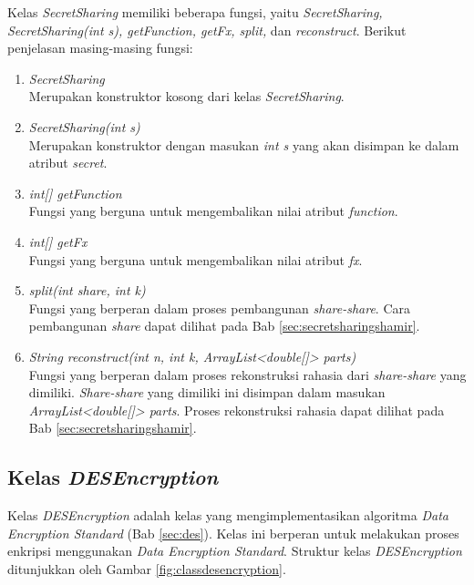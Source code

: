 Kelas \textit{SecretSharing} memiliki beberapa fungsi, yaitu \textit{SecretSharing, SecretSharing(int s), getFunction, getFx, split,} dan \textit{reconstruct}. Berikut penjelasan masing-masing fungsi:

\begin{enumerate}
	\item \textit{SecretSharing} \\
	Merupakan konstruktor kosong dari kelas \textit{SecretSharing}.
	\item \textit{SecretSharing(int s)} \\
	Merupakan konstruktor dengan masukan \textit{int s} yang akan disimpan ke dalam atribut \textit{secret}.
	\item \textit{int[] getFunction} \\
	Fungsi yang berguna untuk mengembalikan nilai atribut \textit{function}.
	\item \textit{int[] getFx} \\
	Fungsi yang berguna untuk mengembalikan nilai atribut \textit{fx}.
	\item \textit{split(int share, int k)} \\
	Fungsi yang berperan dalam proses pembangunan \textit{share-share}. Cara pembangunan \textit{share} dapat dilihat pada Bab \ref{sec:secretsharingshamir}.
	\item \textit{String reconstruct(int n, int k, ArrayList<double[]> parts)} \\
	Fungsi yang berperan dalam proses rekonstruksi rahasia dari \textit{share-share} yang dimiliki. \textit{Share-share} yang dimiliki ini disimpan dalam masukan \textit{ArrayList<double[]> parts}. Proses rekonstruksi rahasia dapat dilihat pada Bab \ref{sec:secretsharingshamir}.
\end{enumerate}

\subsection{Kelas \textit{DESEncryption}}

Kelas \textit{DESEncryption} adalah kelas yang mengimplementasikan algoritma \textit{Data Encryption Standard} (Bab \ref{sec:des}). Kelas ini berperan untuk melakukan proses enkripsi menggunakan \textit{Data Encryption Standard}. Struktur kelas \textit{DESEncryption} ditunjukkan oleh Gambar \ref{fig:classdesencryption}.

